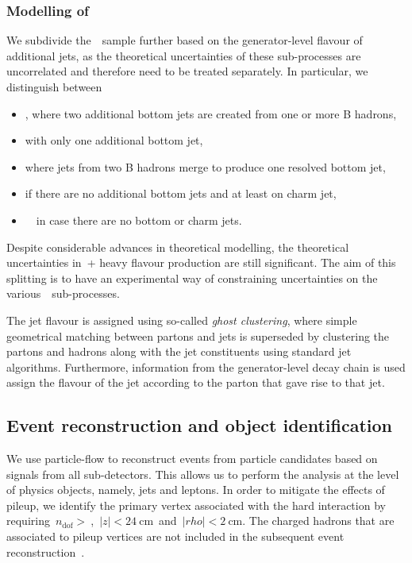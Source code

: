 \subsubsection{Modelling of \ttbar}
\label{sec:ttbar_subprocesses}
We subdivide the~\ttbar~sample further based on the generator-level flavour of additional jets, as the theoretical uncertainties of these sub-processes are uncorrelated and therefore need to be treated separately. In particular, we distinguish between
\begin{itemize}
\item \ttbb, where two additional bottom jets are created from one or more B hadrons,
\item \ttb with only one additional bottom jet,
\item \tttwob where jets from two B hadrons merge to produce one resolved bottom jet,
\item \ttcc if there are no additional bottom jets and at least on charm jet,
\item~\ttlf~in case there are no bottom or charm jets.
\end{itemize}
Despite considerable advances in theoretical modelling, the theoretical uncertainties in~\ttbar + heavy flavour production are still significant\cite{Cascioli:2013era}. The aim of this splitting is to have an experimental way of constraining uncertainties on the various~\ttbar~sub-processes.

The jet flavour is assigned using so-called \textit{ghost clustering}, where simple geometrical matching between partons and jets is superseded by clustering the partons and hadrons along with the jet constituents using standard jet algorithms. Furthermore, information from the generator-level decay chain is used assign the flavour of the jet according to the parton that gave rise to that jet\cite{Bartosik:2047049}.

\subsection{Event reconstruction and object identification}
\label{sec:object_id}
We use particle-flow to reconstruct events from particle candidates based on signals from all sub-detectors. This allows us to perform the analysis at the level of physics objects, namely, jets and leptons\cite{cms_particleflow:2017}. In order to mitigate the effects of pileup, we identify the primary vertex associated with the hard interaction by requiring~$n_{\mathrm{dof}} >~$,~$|z| < 24~\mathrm{cm}$~and~$|rho|<2~\mathrm{cm}$. The charged hadrons that are associated to pileup vertices are not included in the subsequent event reconstruction~\cite{CMS:2014ata}.

